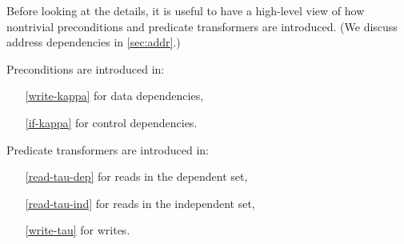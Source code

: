 

Before looking at the details, it is useful to have a high-level view of how
nontrivial preconditions and predicate transformers are introduced.  (We
discuss address dependencies in \textsection\ref{sec:addr}.)
\begin{multicols}{2}
  Preconditions are introduced in: 
  \begin{itemize}
  \item[\eqref{write-kappa}] for data dependencies,
  \item[\eqref{if-kappa}] for control dependencies. 
  \item[] 
  \end{itemize}
  \columnbreak

  Predicate transformers are introduced in:
  \begin{itemize}
  \item[\eqref{read-tau-dep}] for reads in the dependent set,
  \item[\eqref{read-tau-ind}] for reads in the independent set,
  \item[\eqref{write-tau}] for writes.
  \end{itemize}
\end{multicols}


